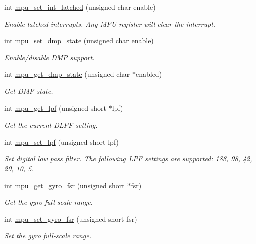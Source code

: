 \begin{DoxyCompactItemize}
int \hyperlink{group___d_r_i_v_e_r_s_ga653cb855300bff9285ce4b8dca6a503b}{mpu\+\_\+set\+\_\+int\+\_\+latched} (unsigned char enable)
\begin{DoxyCompactList}\small\item\em Enable latched interrupts. Any M\+PU register will clear the interrupt. \end{DoxyCompactList}\item 
int \hyperlink{group___d_r_i_v_e_r_s_ga68ed20e6c9663cd7c50469329af8715f}{mpu\+\_\+set\+\_\+dmp\+\_\+state} (unsigned char enable)
\begin{DoxyCompactList}\small\item\em Enable/disable D\+MP support. \end{DoxyCompactList}\item 
int \hyperlink{group___d_r_i_v_e_r_s_gafe0f60ed0d7f8fd2dcd55d45b95a2363}{mpu\+\_\+get\+\_\+dmp\+\_\+state} (unsigned char $\ast$enabled)
\begin{DoxyCompactList}\small\item\em Get D\+MP state. \end{DoxyCompactList}\item 
int \hyperlink{group___d_r_i_v_e_r_s_gaa95c7e216dcb2d888e9796001ca555f8}{mpu\+\_\+get\+\_\+lpf} (unsigned short $\ast$lpf)
\begin{DoxyCompactList}\small\item\em Get the current D\+L\+PF setting. \end{DoxyCompactList}\item 
int \hyperlink{group___d_r_i_v_e_r_s_ga5661a9dee25152166769910767a2a93d}{mpu\+\_\+set\+\_\+lpf} (unsigned short lpf)
\begin{DoxyCompactList}\small\item\em Set digital low pass filter. The following L\+PF settings are supported\+: 188, 98, 42, 20, 10, 5. \end{DoxyCompactList}\item 
int \hyperlink{group___d_r_i_v_e_r_s_gaf973c32c73ba912ff512aab948fc31ca}{mpu\+\_\+get\+\_\+gyro\+\_\+fsr} (unsigned short $\ast$fsr)
\begin{DoxyCompactList}\small\item\em Get the gyro full-\/scale range. \end{DoxyCompactList}\item 
int \hyperlink{group___d_r_i_v_e_r_s_gad09e6031c8677adc0b8a39b6deea8e27}{mpu\+\_\+set\+\_\+gyro\+\_\+fsr} (unsigned short fsr)
\begin{DoxyCompactList}\small\item\em Set the gyro full-\/scale range. \end{DoxyCompactList}\item 

\end{DoxyCompactItemize}
